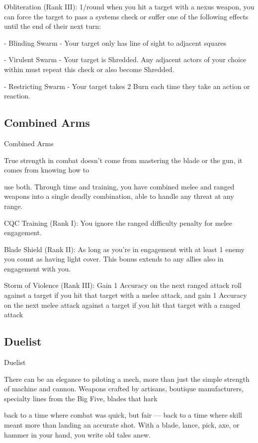 Obliteration (Rank III): 1/round when you hit a target with a nexus weapon, you can force the  
target to pass a systems check or suffer one of the following effects until the end of their next  
turn:
 
	        - Blinding Swarm - Your target only has line of sight to adjacent squares
 
	        - Virulent Swarm - Your target is Shredded. Any adjacent actors of your choice within  
must repeat this check or also become Shredded.
 
	        - Restricting Swarm - Your target takes 2 Burn each time they take an action or reaction.
 
\subsection{Combined Arms}

                                             Combined Arms  

True strength in combat doesn’t come from mastering the blade or the gun, it comes from knowing how to  

use both. Through time and training, you have combined melee and ranged weapons into a single deadly  
combination, able to handle any threat at any range.    

CQC Training (Rank I): You ignore the ranged difficulty penalty for melee engagement.
 
Blade Shield (Rank II): As long as you’re in engagement with at least 1 enemy you count as  
having light cover. This bonus extends to any allies also in engagement with you.
 
Storm of Violence (Rank III): Gain 1 Accuracy on the next ranged attack roll against a target if  
you hit that target with a melee attack, and gain 1 Accuracy on the next melee attack against a  
target if you hit that target with a ranged attack
 
\subsection{Duelist}

                                                     Duelist  

There can be an elegance to piloting a mech, more than just the simple strength of machine and cannon.  
Weapons crafted by artisans, boutique manufacturers, specialty lines from the Big Five, blades that hark  

back to a time where combat was quick, but fair — back to a time where skill meant more than landing an  
accurate shot. With a blade, lance, pick, axe, or hammer in your hand, you write old tales anew.  

